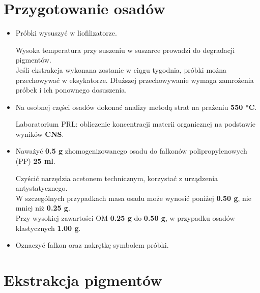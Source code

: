 \documentclass[
  letterpaper,
  DIV=11,
  numbers=noendperiod]{scrreprt}
\begin{document}
\hypertarget{przygotowanie-osaduxf3w-1}{%
\section{Przygotowanie osadów}\label{przygotowanie-osaduxf3w-1}}

\begin{itemize}
\item
  Próbki wysuszyć w liofilizatorze.

  Wysoka temperatura przy suszeniu w suszarce prowadzi do degradacji
  pigmentów.\\
  Jeśli ekstrakcja wykonana zostanie w ciągu tygodnia, próbki można
  przechowywać w eksykatorze. Dłuższej przechowywanie wymaga zamrożenia
  próbek i ich ponownego dosuszenia.
\item
  Na osobnej części osadów dokonać analizy metodą strat na prażeniu
  \textbf{550 °C}.

  Laboratorium PRL: obliczenie koncentracji materii organicznej na
  podstawie wyników \textbf{CNS}.
\item
  Naważyć \textbf{0.5 g} zhomogenizowanego osadu do falkonów
  polipropylenowych (PP) \textbf{25 ml}.

  Czyścić narzędzia acetonem technicznym, korzystać z urządzenia
  antystatycznego.\\
  W szczególnych przypadkach masa osadu może wynosić poniżej
  \textbf{0.50 g}, nie mniej niż \textbf{0.25 g}.\\
  Przy wysokiej zawartości OM \textbf{0.25 g} do \textbf{0.50 g}, w
  przypadku osadów klastycznych \textbf{1.00 g}.
\item
  Oznaczyć falkon oraz nakrętkę symbolem próbki.
\end{itemize}

\hypertarget{ekstrakcja-pigmentuxf3w}{%
\section{Ekstrakcja pigmentów}\label{ekstrakcja-pigmentuxf3w}}
\end{document}
